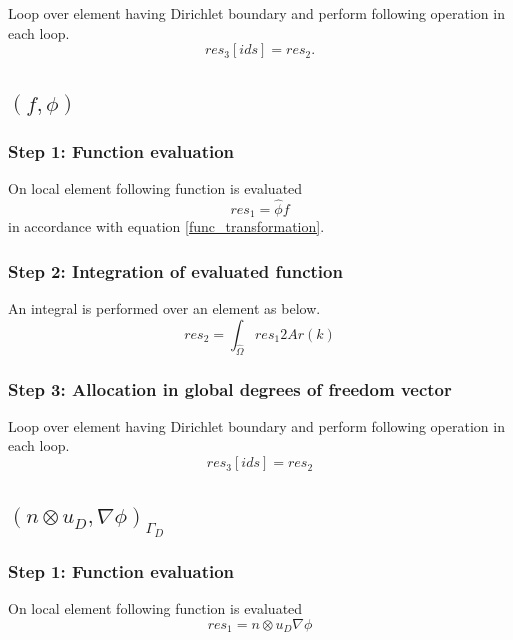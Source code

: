 \documentclass[a4paper,openany]{book}
\begin{document}
Loop over element having Dirichlet boundary and perform following operation in each loop.
\begin{equation}
res_3[ids]=res_2.
\end{equation}

\subsection{$(f,\phi) $}

\subsubsection{Step 1: Function evaluation}

On local element following function is evaluated 
\begin{equation}
res_1 = \hat{\phi} f
\end{equation} 
in accordance with equation \ref{func_transformation}.\\

\subsubsection{Step 2: Integration of evaluated function}
An integral is performed over an element as below.
\begin{equation}
res_2 = \int_{\hat{\Omega}} res_1 2 Ar(k)
\end{equation}

\subsubsection{Step 3: Allocation in global degrees of freedom vector}

Loop over element having Dirichlet boundary and perform following operation in each loop.
\begin{equation}
res_3[ids]=res_2
\end{equation}


\subsection{$(n \otimes u_D,\nabla \phi)_{\Gamma_D} $}

\subsubsection{Step 1: Function evaluation}

On local element following function is evaluated 
\begin{equation}
res_1 =  n \otimes u_D  \nabla \phi
\end{equation}
\end{document}
